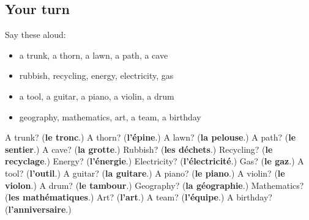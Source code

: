 \subsection*{Your turn}
Say these aloud:

\begin{itemize}
\raggedright
  \item a trunk, a thorn, a lawn, a path, a cave
  \item rubbish, recycling, energy, electricity, gas
  \item a tool, a guitar, a piano, a violin, a drum
  \item geography, mathematics, art, a team, a birthday
\end{itemize}

\begin{tcolorbox}[breakable,colback=teal!4,colframe=teal!35!black,title={Before you move on}]
A trunk? (\textbf{le tronc}.) A thorn? (\textbf{l'épine}.) A lawn? (\textbf{la pelouse}.) A path? (\textbf{le sentier}.) A cave? (\textbf{la grotte}.) Rubbish? (\textbf{les déchets}.) Recycling? (\textbf{le recyclage}.) Energy? (\textbf{l'énergie}.) Electricity? (\textbf{l'électricité}.) Gas? (\textbf{le gaz}.) A tool? (\textbf{l'outil}.) A guitar? (\textbf{la guitare}.) A piano? (\textbf{le piano}.) A violin? (\textbf{le violon}.) A drum? (\textbf{le tambour}.) Geography? (\textbf{la géographie}.) Mathematics? (\textbf{les mathématiques}.) Art? (\textbf{l'art}.) A team? (\textbf{l'équipe}.) A birthday? (\textbf{l'anniversaire}.)
\end{tcolorbox}
